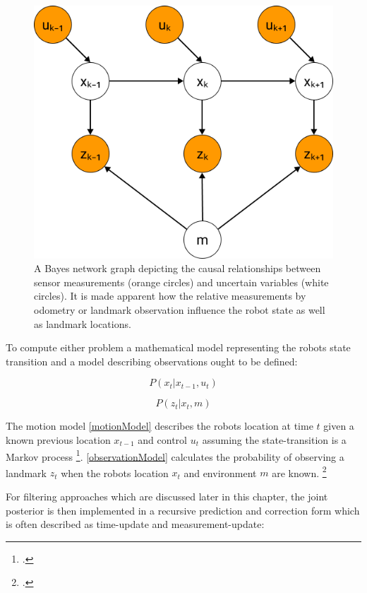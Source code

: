 \begin{figure}
	\centering
	\includegraphics[width=0.4\linewidth]{img/SlamGraphical}
	\caption{
		A Bayes network graph depicting the causal relationships between sensor measurements (orange circles) and uncertain variables (white circles). It is made apparent how the relative measurements by odometry or landmark observation influence the robot state as well as landmark locations. 
	}
	\label{fig:slamGraphical}
\end{figure}

To compute either problem a mathematical model representing the robots state transition and a model describing observations ought to be defined:

\begin{equation}\label{motionModel}
	P(x_{t} | x_{t-1}, u_{t})
\end{equation}

\begin{equation}\label{observationModel}
	P(z_{t} | x_{t}, m)
\end{equation}

The motion model \ref{motionModel} describes the robots location at time $ t $ given a known previous location $ x_{t-1} $ and control $ u_{t} $ assuming the state-transition is a Markov process \footcite{haeneltMarvoModel2006}.
\ref{observationModel} calculates the probability of observing a landmark $ z_{t} $ when the robots location $ x_{t} $ and environment $ m $ are known.
\footcite{durrantSlam2006}


For filtering approaches which are discussed later in this chapter, the joint posterior is then implemented in a recursive prediction and correction form which is often described as time-update and measurement-update:

